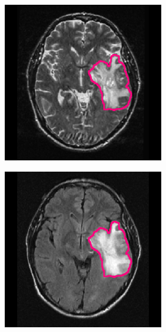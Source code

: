\begin{subappendices}
\begin{figure}[htbp]
\begin{subfigure}[b]{0.95\textwidth}
\begin{subfigure}[b]{0.215\textwidth}
        \end{subfigure}
        \hfill
        \begin{subfigure}[b]{0.215\textwidth}
        \includegraphics[width=\textwidth, clip, trim=2.5cm 0.5cm 2.5cm 0.5cm]{Figures/Random_segs/T2_TCGA-08-0353.png}
        \end{subfigure}
        \hfill
        \begin{subfigure}[b]{0.215\textwidth}
        \includegraphics[width=\textwidth, clip, trim=2.5cm 0.5cm 2.5cm 0.5cm]{Figures/Random_segs/FLAIR_TCGA-08-0353.png}

\end{subfigure}
\end{subfigure}
\end{figure}
\end{subappendices}
